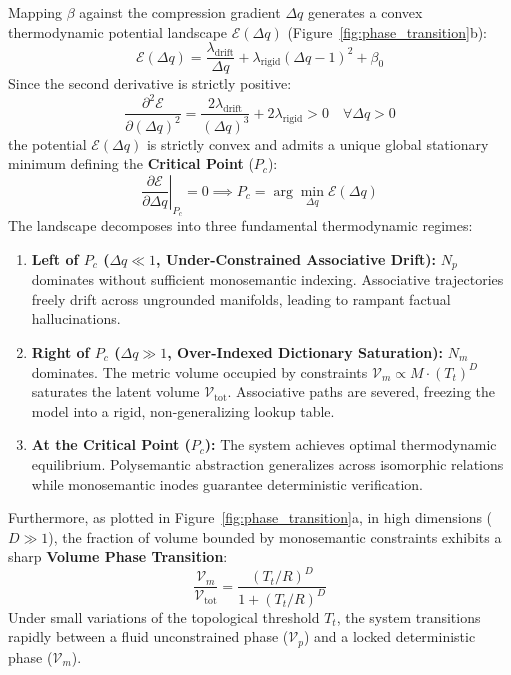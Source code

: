 \documentclass[10pt,twocolumn]{article}
\theoremstyle{definition}
\begin{document}
Mapping $\beta$ against the compression gradient $\Delta q$ generates a convex thermodynamic potential landscape $\mathcal{E}(\Delta q)$ (Figure~\ref{fig:phase_transition}b):
\begin{equation}
    \mathcal{E}(\Delta q) = \frac{\lambda_{\mathrm{drift}}}{\Delta q} + \lambda_{\mathrm{rigid}} (\Delta q - 1)^2 + \beta_0
    \label{eq:potential_landscape}
\end{equation}
Since the second derivative is strictly positive:
\begin{equation}
    \frac{\partial^2 \mathcal{E}}{\partial (\Delta q)^2} = \frac{2 \lambda_{\mathrm{drift}}}{(\Delta q)^3} + 2 \lambda_{\mathrm{rigid}} > 0 \quad \forall \Delta q > 0
\end{equation}
the potential $\mathcal{E}(\Delta q)$ is strictly convex and admits a unique global stationary minimum defining the \textbf{Critical Point} ($P_c$):
\begin{equation}
    \left. \frac{\partial \mathcal{E}}{\partial \Delta q} \right|_{P_c} = 0 \implies P_c = \arg\min_{\Delta q} \mathcal{E}(\Delta q)
\end{equation}
The landscape decomposes into three fundamental thermodynamic regimes:
\begin{enumerate}[leftmargin=*, itemsep=1.5pt]
    \item \textbf{Left of $P_c$ ($\Delta q \ll 1$, Under-Constrained Associative Drift):} $N_p$ dominates without sufficient monosemantic indexing. Associative trajectories freely drift across ungrounded manifolds, leading to rampant factual hallucinations.
    \item \textbf{Right of $P_c$ ($\Delta q \gg 1$, Over-Indexed Dictionary Saturation):} $N_m$ dominates. The metric volume occupied by constraints $\mathcal{V}_m \propto M \cdot (T_t)^D$ saturates the latent volume $\mathcal{V}_{\mathrm{tot}}$. Associative paths are severed, freezing the model into a rigid, non-generalizing lookup table.
    \item \textbf{At the Critical Point ($P_c$):} The system achieves optimal thermodynamic equilibrium. Polysemantic abstraction generalizes across isomorphic relations while monosemantic inodes guarantee deterministic verification.
\end{enumerate}

Furthermore, as plotted in Figure~\ref{fig:phase_transition}a, in high dimensions ($D \gg 1$), the fraction of volume bounded by monosemantic constraints exhibits a sharp \textbf{Volume Phase Transition}:
\begin{equation}
    \frac{\mathcal{V}_m}{\mathcal{V}_{\mathrm{tot}}} = \frac{(T_t / R)^D}{1 + (T_t / R)^D}
\end{equation}
Under small variations of the topological threshold $T_t$, the system transitions rapidly between a fluid unconstrained phase ($\mathcal{V}_p$) and a locked deterministic phase ($\mathcal{V}_m$).
\end{document}
